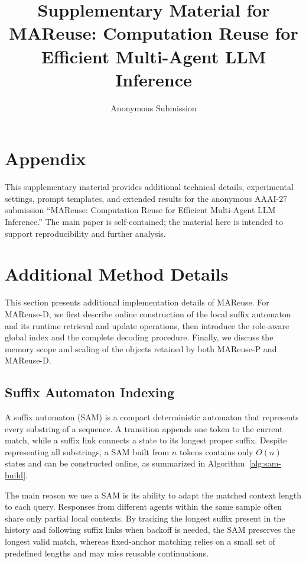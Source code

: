 \documentclass[letterpaper]{article} %
\title{Supplementary Material for\\
MAReuse: Computation Reuse for Efficient Multi-Agent LLM Inference}
\author{Anonymous Submission}
\begin{document}
\maketitle

\section*{Appendix}

This supplementary material provides additional technical details, experimental settings, prompt templates, and extended results for the anonymous AAAI-27 submission ``MAReuse: Computation Reuse for Efficient Multi-Agent LLM Inference.'' The main paper is self-contained; the material here is intended to support reproducibility and further analysis.

\section{Additional Method Details}

This section presents additional implementation details of MAReuse. For MAReuse-D, we first describe online construction of the local suffix automaton and its runtime retrieval and update operations, then introduce the role-aware global index and the complete decoding procedure. Finally, we discuss the memory scope and scaling of the objects retained by both MAReuse-P and MAReuse-D.

\subsection{Suffix Automaton Indexing}

A suffix automaton (SAM) is a compact deterministic automaton that represents every substring of a sequence. A transition appends one token to the current match, while a suffix link connects a state to its longest proper suffix. Despite representing all substrings, a SAM built from $n$ tokens contains only $O(n)$ states and can be constructed online, as summarized in Algorithm~\ref{alg:sam-build}.

The main reason we use a SAM is its ability to adapt the matched context length to each query. Responses from different agents within the same sample often share only partial local contexts. By tracking the longest suffix present in the history and following suffix links when backoff is needed, the SAM preserves the longest valid match, whereas fixed-anchor matching relies on a small set of predefined lengths and may miss reusable continuations.
\end{document}
